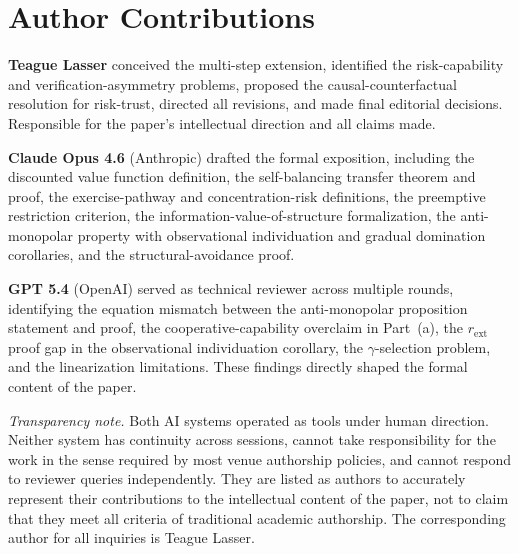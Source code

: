 \section*{Author Contributions}

\textbf{Teague Lasser} conceived the multi-step extension, identified the
risk-capability and verification-asymmetry problems, proposed the
causal-counterfactual resolution for risk-trust, directed all revisions, and
made final editorial decisions. Responsible for the paper's intellectual
direction and all claims made.

\textbf{Claude Opus 4.6} (Anthropic) drafted the formal exposition, including
the discounted value function definition, the self-balancing transfer theorem
and proof, the exercise-pathway and concentration-risk definitions, the
preemptive restriction criterion, the information-value-of-structure
formalization, the anti-monopolar property with observational individuation
and gradual domination corollaries, and the structural-avoidance proof.

\textbf{GPT 5.4} (OpenAI) served as technical reviewer across multiple
rounds, identifying the equation mismatch between the anti-monopolar
proposition statement and proof, the cooperative-capability overclaim in
Part~(a), the $r_{\mathrm{ext}}$ proof gap in the observational
individuation corollary, the $\gamma$-selection problem, and the
linearization limitations. These findings directly shaped the formal
content of the paper.

\medskip
\noindent\emph{Transparency note.} Both AI systems operated as tools under
human direction. Neither system has continuity across sessions, cannot take
responsibility for the work in the sense required by most venue authorship
policies, and cannot respond to reviewer queries independently. They are
listed as authors to accurately represent their contributions to the
intellectual content of the paper, not to claim that they meet all criteria
of traditional academic authorship. The corresponding author for all
inquiries is Teague Lasser.
